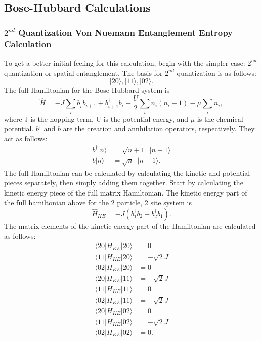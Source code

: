 \subsection{Bose-Hubbard Calculations}
\subsubsection{\textbf{$2^{nd}$ Quantization Von Nuemann Entanglement Entropy Calculation}}
To get a better initial feeling for this calculation, begin with the simpler case: $2^{nd}$ quantization or spatial entanglement. The basis for $2^{nd}$ quantization is as follows:
\begin{equation}
|2 0 \rangle, |1 1 \rangle, |0 2 \rangle.
\end{equation}
\noindent The full Hamiltonian for the Bose-Hubbard system is
\begin{equation}
\hat{H} = -J\sum_i{b_i^{\dagger}b_{i+1} + b_{i+1}^{\dagger}b_i} + \frac{U}{2}\sum_i{n_i(n_i - 1)} - \mu\sum_i{n_i},
\end{equation}
\noindent where J is the hopping term, U is the potential energy, and $\mu$ is the chemical potential. $b^{\dagger}$ and $b$ are the creation and annhilation operators, respectively. They act as follows:
\begin{align}
b^{\dagger}|n\rangle &= \sqrt{n+1}\enspace|n+1\rangle \\
b|n\rangle &= \sqrt{n}\enspace|n-1\rangle.
\end{align}
\noindent The full Hamiltonian can be calculated by calculating the kinetic and potential pieces separately, then simply adding them together. Start by calculating the kinetic energy piece of the full matrix Hamiltonian. The kinetic energy part of the full hamiltonian above for the 2 particle, 2 site system is
\begin{equation}
\hat{H}_{KE}=-J(b_1^{\dagger}b_2+b_2^{\dagger}b_1).
\end{equation}
\noindent The matrix elements of the kinetic energy part of the Hamiltonian are calculated as follows:
\begin{align*}
\langle{20|H_{KE}|20\rangle} &=0 \\
\langle{11|H_{KE}|20\rangle} &=-\sqrt{2}J \\
\langle{02|H_{KE}|20\rangle} &=0 \\
\langle{20|H_{KE}|11\rangle} &=-\sqrt{2}J \\
\langle{11|H_{KE}|11\rangle} &=0 \\
\langle{02|H_{KE}|11\rangle} &=-\sqrt{2}J \\
\langle{20|H_{KE}|02\rangle} &=0 \\
\langle{11|H_{KE}|02\rangle} &=-\sqrt{2}J \\
\langle{02|H_{KE}|02\rangle} &=0.
\end{align*}
